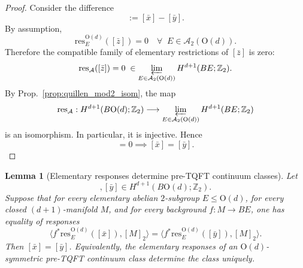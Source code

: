 \documentclass[aps,prx,reprint,superscriptaddress,twocolumn,amsmath,amssymb,amsfonts, nofootinbib]{revtex4-2}
\newcommand{\qa}{\mathcal{A}_{2}}
\newcommand{\res}{\text{res}}
\theoremstyle{apsstyle}
\newtheorem{lemma}{Lemma}
\begin{document}
\begin{proof}
Consider the difference
\begin{equation*}
[\bar z]:=[\bar x]-[\bar y].
\end{equation*}
By assumption,
\begin{equation*}
\res^{\mathrm{O}(d)}_{E}([\bar z])=0
\quad \forall \;\; E\in\qa(\mathrm{O}(d)).
\end{equation*}
Therefore the compatible family of elementary restrictions of $[\bar z]$ is zero:
\begin{equation*}
\res_{\mathcal A}([\bar z])=0\; \in 
\varprojlim_{E\in\qa(\mathrm{O}(d))}
H^{d+1}(BE;\mathbb Z_2).
\end{equation*}
By Prop.~\ref{prop:quillen_mod2_isom}, the map
\[
\res_{\mathcal A}:
H^{d+1}(B\mathrm{O}(d);\mathbb Z_2)
\longrightarrow
\varprojlim_{E\in\qa(\mathrm{O}(d))}
H^{d+1}(BE;\mathbb Z_2)
\]
is an isomorphism. In particular, it is injective. Hence
\begin{equation*}
[\bar z]=0 \implies  [\bar x]=[\bar y].
\end{equation*}
\end{proof}


\begin{lemma}[Elementary responses determine pre-TQFT continuum classes]
\label{lemma:elem_response_detect_pretqft}
Let
\begin{equation*}
[\bar x],[\bar y]\in H^{d+1}(B\mathrm{O}(d);\mathbb Z_2).
\end{equation*}
Suppose that for every elementary abelian $2$-subgroup $E\leq \mathrm{O}(d)$, for every closed $(d+1)$-manifold $M$, and for every background $f:M\to BE$, one has equality of responses
\begin{equation*}
\big\langle f^*\res^{\mathrm{O}(d)}_{E}([\bar x]),[M]_2\big\rangle =
\big\langle f^*\res^{\mathrm{O}(d)}_{E}([\bar y]),[M]_2\big\rangle .
\end{equation*}
Then $[\bar x]=[\bar y]$. Equivalently, the elementary responses of an $\mathrm{O}(d)$-symmetric pre-TQFT continuum class determine the class uniquely.
\end{lemma}
\end{document}
